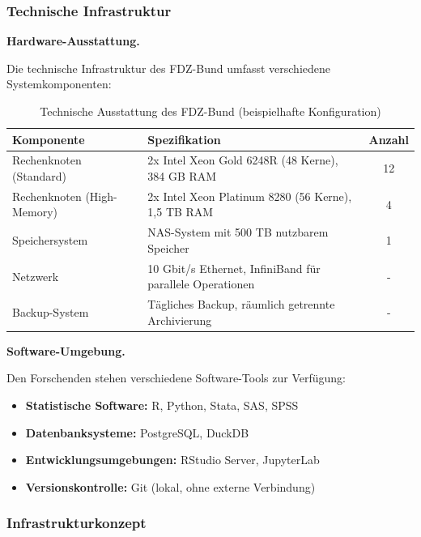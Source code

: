 \documentclass[
  german,
  10pt,
  twoside]{article}
\providecommand{\tightlist}{%
  \setlength{\itemsep}{0pt}\setlength{\parskip}{0pt}}
\begin{document}
\subsubsection{Technische Infrastruktur}\label{technische-infrastruktur}

\textbf{Hardware-Ausstattung.}

Die technische Infrastruktur des FDZ-Bund umfasst verschiedene
Systemkomponenten:

\begin{table}[htbp]
\caption{Technische Ausstattung des FDZ-Bund (beispielhafte Konfiguration)}
\label{tbl-fdz-infrastructure}
\centering
\begin{tabular*}{\textwidth}{@{\extracolsep{\fill}}llc@{}}
\toprule
Komponente & Spezifikation & Anzahl\\
\midrule
Rechenknoten (Standard) & 2x Intel Xeon Gold 6248R (48 Kerne), 384 GB RAM & 12\\
Rechenknoten (High-Memory) & 2x Intel Xeon Platinum 8280 (56 Kerne), 1,5 TB RAM & 4\\
Speichersystem & NAS-System mit 500 TB nutzbarem Speicher & 1\\
Netzwerk & 10 Gbit/s Ethernet, InfiniBand für parallele Operationen & -\\
Backup-System & Tägliches Backup, räumlich getrennte Archivierung & -\\
\bottomrule
\end{tabular*}
\end{table}

\textbf{Software-Umgebung.}

Den Forschenden stehen verschiedene Software-Tools zur Verfügung:

\begin{itemize}
\tightlist
\item
  \textbf{Statistische Software:} R, Python, Stata, SAS, SPSS
\item
  \textbf{Datenbanksysteme:} PostgreSQL, DuckDB
\item
  \textbf{Entwicklungsumgebungen:} RStudio Server, JupyterLab
\item
  \textbf{Versionskontrolle:} Git (lokal, ohne externe Verbindung)
\end{itemize}

\subsubsection{Infrastrukturkonzept}\label{infrastrukturkonzept}
\end{document}
